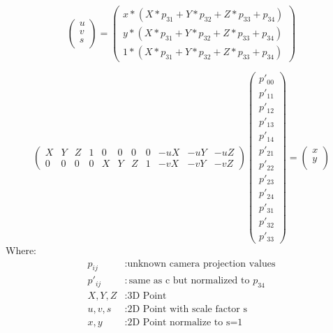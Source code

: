 \documentclass[11pt,a4paper,titlepage,oneside]{report}
\begin{document}
\begin{equation}\label{eq:projection_flat_s}
	\begin{pmatrix}u\\
		v\\
		s\\
	\end{pmatrix}=\begin{pmatrix}
		x*(X*p_{31}+Y*p_{32}+Z*p_{33}+p_{34})\\
		y*(X*p_{31}+Y*p_{32}+Z*p_{33}+p_{34})\\
		1*(X*p_{31}+Y*p_{32}+Z*p_{33}+p_{34})
	\end{pmatrix}
\end{equation}


\begin{equation}\label{eq:projection_flat_red}
	\begin{pmatrix}
		X & Y & Z & 1 & 0 & 0 & 0 & 0 & -uX & -uY & -uZ\\
		0 & 0 & 0 & 0 & X & Y & Z & 1 & -vX & -vY & -vZ
	\end{pmatrix}
	\begin{pmatrix}
		p'_{00}\\
		p'_{11}\\
		p'_{12}\\
		p'_{13}\\
		p'_{14}\\
		p'_{21}\\
		p'_{22}\\
		p'_{23}\\
		p'_{24}\\
		p'_{31}\\
		p'_{32}\\
		p'_{33}
	\end{pmatrix}=
	\begin{pmatrix}x\\
		y\\
	\end{pmatrix}
\end{equation}
Where:
\begin{align*}
	p_{ij}		&: \text{unknown camera projection values}\\
	p'_{ij}		&: \text{same as c but normalized to $p_{34}$}\\
	X,Y,Z			&: \text{3D Point}\\
	u,v,s			&: \text{2D Point with scale factor s}\\
	x,y				&: \text{2D Point normalize to s=1}\\
\end{align*}
\end{document}
